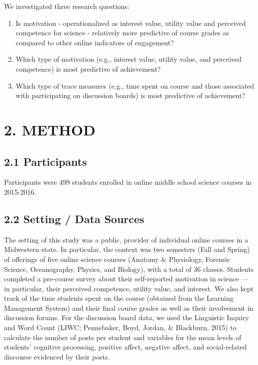 \documentclass[acmart]{apa6}
\providecommand{\tightlist}{%
  \setlength{\itemsep}{0pt}\setlength{\parskip}{0pt}}
\theoremstyle{definition}
\theoremstyle{definition}
\theoremstyle{definition}
\theoremstyle{remark}
\begin{document}
We investigated three research questions:

\begin{enumerate}
\def\labelenumi{\arabic{enumi}.}
\tightlist
\item
  Is motivation - operationalized as interest value, utility value and
  perceived competence for science - relatively more predictive of
  course grades as compared to other online indicators of engagement?
\item
  Which type of motivation (e.g., interest value, utility value, and
  perceived competence) is most predictive of achievement?
\item
  Which type of trace measures (e.g., time spent on course and those
  associated with participating on discussion boards) is most predictive
  of achievement?
\end{enumerate}

\section{2. METHOD}\label{method}

\subsection{2.1 Participants}\label{participants}

Participants were 499 students enrolled in online middle school science
courses in 2015-2016.

\subsection{2.2 Setting / Data Sources}\label{setting-data-sources}

The setting of this study was a public, provider of individual online
courses in a Midwestern state. In particular, the context was two
semesters (Fall and Spring) of offerings of five online science courses
(Anatomy \& Physiology, Forensic Science, Oceanography, Physics, and
Biology), with a total of 36 classes. Students completed a pre-course
survey about their self-reported motivation in science --- in
particular, their perceived competence, utility value, and interest. We
also kept track of the time students spent on the course (obtained from
the Learning Management System) and their final course grades as well as
their involvement in discussion forums. For the discussion board data,
we used the Linguistic Inquiry and Word Count (LIWC; Pennebaker, Boyd,
Jordan, \& Blackburn, 2015) to calculate the number of posts per student
and variables for the mean levels of students' cognitive processing,
positive affect, negative affect, and social-related discourse evidenced
by their posts.
\end{document}

